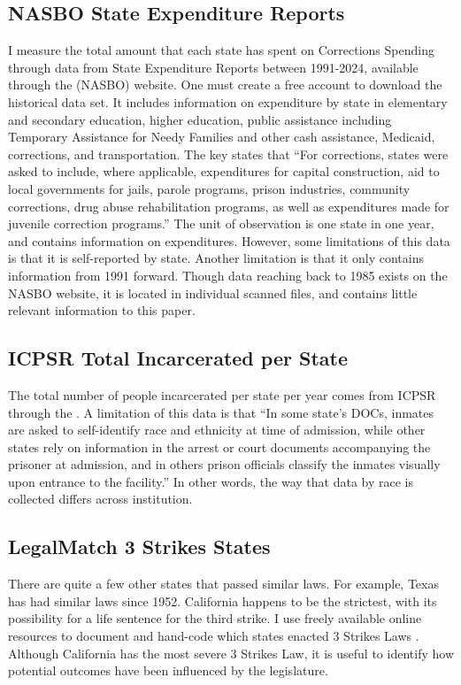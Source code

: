 \documentclass[12pt]{article}
\begin{document}
\subsection{NASBO State Expenditure Reports}
    I measure the total amount that each state has spent on Corrections Spending through data from State Expenditure Reports between 1991-2024, available through the \cite{nasbo2024} (NASBO) website. One must create a free account to download the historical data set. It includes information on expenditure by state in elementary and secondary education, higher education, public assistance including Temporary Assistance for Needy Families and other cash assistance, Medicaid, corrections, and transportation. The key states that “For corrections, states were asked to include, where applicable, expenditures for capital construction, aid to local governments for jails, parole programs, prison industries, community corrections, drug abuse rehabilitation programs, as well as expenditures made for juvenile correction programs.” The unit of observation is one state in one year, and contains information on expenditures. However, some limitations of this data is that it is self-reported by state. Another limitation is that it only contains information from 1991 forward. Though data reaching back to 1985 exists on the NASBO website, it is located in individual scanned files, and contains little relevant information to this paper.

\subsection{ICPSR Total Incarcerated per State}
    The total number of people incarcerated per state per year comes from ICPSR through the \cite{icpsr_ncrp}. A limitation of this data is that “In some state's DOCs, inmates are asked to self-identify race and ethnicity at time of admission, while other states rely on information in the arrest or court documents accompanying the prisoner at admission, and in others prison officials classify the inmates visually upon entrance to the facility.” In other words, the way that data by race is collected differs across institution. 

\subsection{LegalMatch 3 Strikes States}
    There are quite a few other states that passed similar laws. For example, Texas has had similar laws since 1952. California happens to be the strictest, with its possibility for a life sentence for the third strike. I use freely available online resources to document and hand-code which states enacted 3 Strikes Laws \parencite{legalmatch_threestrikes}. Although California has the most severe 3 Strikes Law, it is useful to identify how potential outcomes have been influenced by the legislature. 
\end{document}
